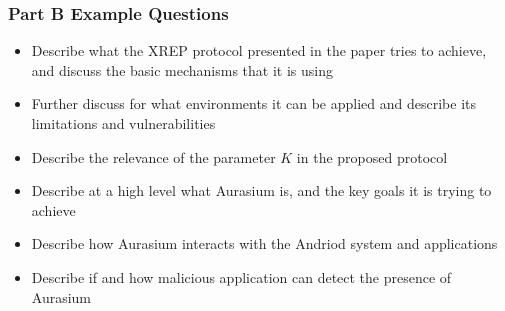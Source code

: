 \documentclass[12pt, a4paper]{article}
\begin{document}
\begin{multicols*}{2}
\subsubsection{Part B Example Questions}
\begin{itemize}
	\item Describe what the XREP protocol presented in the paper tries to achieve, and discuss the basic mechanisms that it is using
	\item Further discuss for what environments it can be applied and describe its limitations and vulnerabilities
	\item Describe the relevance of the parameter $K$ in the proposed protocol
	\item Describe at a high level what Aurasium is, and the key goals it is trying to achieve
	\item Describe how Aurasium interacts with the Andriod system and applications
	\item Describe if and how malicious application can detect the presence of Aurasium
\end{itemize}
		
	\end{multicols*}
\end{document}
